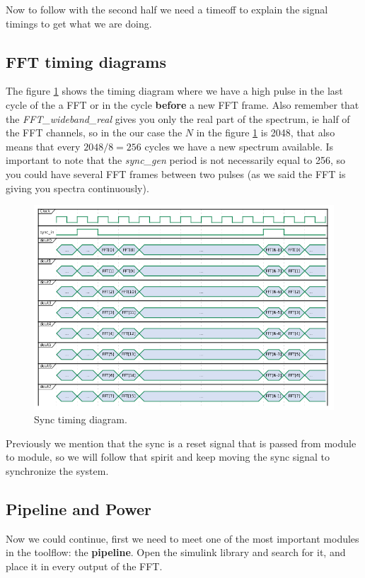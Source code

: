 Now to follow with the second half we need a timeoff to explain the signal timings to get what we are doing.

\subsection{FFT timing diagrams}
The figure \ref{fig:sync_image} shows the timing diagram where we have a high pulse in the last cycle of the a FFT or in the cycle \textbf{before} a new FFT frame. Also remember that the \textit{FFT\_wideband\_real} gives you only the real part of the spectrum, ie half of the FFT channels, so in the our case the $N$ in the figure \ref{fig:sync_image} is 2048, that also means that every $2048/8=256$ cycles we have a new spectrum available.
Is important to note that the \textit{sync\_gen} period is not necessarily equal to 256, so you could have several FFT frames between two pulses (as we said the FFT is giving you spectra continuously). 


\begin{figure}[t]
    \centering
    \includegraphics[scale=0.5]{images/sync_timing.png}
    \caption{Sync timing diagram.}
    \label{fig:sync_image}
\end{figure}


Previously we mention that the sync is a reset signal that is passed from module to module, so we will follow that spirit and keep moving the sync signal to synchronize the system.

\clearpage

\subsection{Pipeline and Power}
Now we could continue, first we need to meet one of the most important modules in the toolflow: the \textbf{pipeline}. Open the simulink library and search for it, and place it in every output of the FFT.

